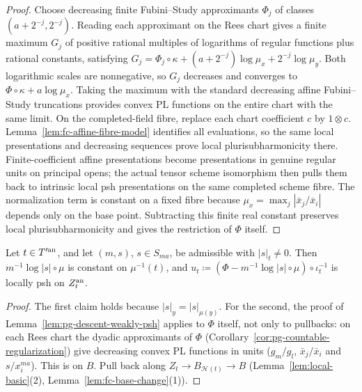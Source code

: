 \begin{proof}
Choose decreasing finite Fubini--Study approximants $\Phi_j$ of classes $(a+2^{-j},2^{-j})$.
Reading each approximant on the Rees chart gives a finite maximum $G_j$ of positive rational multiples of
logarithms of regular functions plus rational constants, satisfying
$G_j=\Phi_j\circ\kappa+(a+2^{-j})\log\mu_x+2^{-j}\log\mu_y$.
Both logarithmic scales are nonnegative, so $G_j$ decreases and converges to
$\Phi\circ\kappa+a\log\mu_x$. Taking the maximum with the standard decreasing affine Fubini--Study truncations
provides convex PL functions on the entire chart with the same limit. On the completed-field fibre, replace each
chart coefficient $c$ by $1\otimes c$. Lemma~\ref{lem:fc-affine-fibre-model} identifies all evaluations,
so the same local presentations and decreasing sequences prove local plurisubharmonicity there.
Finite-coefficient affine presentations become presentations in genuine regular units on principal opens; the
actual tensor scheme isomorphism then pulls them back to intrinsic local psh presentations on the same completed
scheme fibre. The normalization term is constant on a fixed fibre because
$\mu_x=\max_j|\bar x_j/\bar x_i|$ depends only on the base point. Subtracting this finite real constant
preserves local plurisubharmonicity and gives the restriction of $\Phi$ itself.
\end{proof}

\begin{lemma}\label{lem:fc-fibre-psh}
\notready
{}
Let $t\in T'^{\mathrm{an}}$, and let $(m,s)$, $s\in S_{ma}$, be admissible with $|s|_t\ne0$. Then $m^{-1}\log|s|\circ\mu$ is constant on
$\mu^{-1}(t)$, and $u_t\coloneqq(\Phi-m^{-1}\log|s|\circ\mu)\circ\iota_t^{-1}$ is locally psh on $Z_t^{\mathrm{an}}$.
\end{lemma}

\begin{proof}
The first claim holds because $|s|_y=|s|_{\mu(y)}$. For the second, the proof of
Lemma~\ref{lem:pg-descent-weakly-psh} applies to $\Phi$ itself, not only to pullbacks: on each Rees chart the dyadic
approximants of $\Phi$ (Corollary~\ref{cor:pg-countable-regularization}) give decreasing convex PL functions in units
($g_m/g_l$, $\bar x_j/\bar x_i$ and $s/x_i^{ma}$). This is \cite[Lemma~5.4(2)]{FHX} on $B$. Pull back along
$Z_t\to B_{\mathcal H(t)}\to B$ (Lemma~\ref{lem:local-basic}(2), Lemma~\ref{lem:fc-base-change}(1)).
\end{proof}

